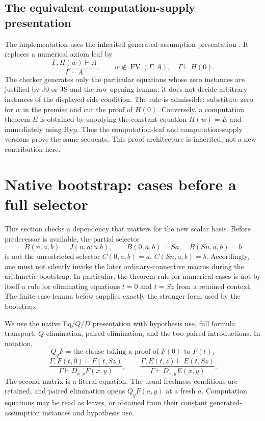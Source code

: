 \documentclass[11pt,letterpaper]{article}
\theoremstyle{definition}\newtheorem{definition}[theorem]{Definition}
\theoremstyle{remark}\newtheorem{remark}[theorem]{Remark}
\newcommand{\FV}{\operatorname{FV}}
\begin{document}
\subsection{The equivalent computation-supply presentation}
The implementation uses the inherited generated-assumption presentation
\cite{generated}. It replaces a numerical axiom leaf by
\[
 \frac{\Gamma,H(w)\vdash A}{\Gamma\vdash A},\qquad
 w\notin\FV(\Gamma,A),\quad \Gamma\vdash H(0).
 \tag{Known-instance supply}
\]
The checker generates only the particular equations whose zero instances
are justified by J0 or JS and the raw opening lemma; it does not decide
arbitrary instances of the displayed side condition. The rule is
admissible: substitute zero for $w$ in the premise and cut the proof of
$H(0)$. Conversely, a computation theorem $E$ is obtained by supplying
the constant equation $H(w)=E$ and immediately using Hyp. Thus the
computation-leaf and computation-supply versions prove the same sequents.
This proof architecture is inherited, not a new contribution here.


\section{Native bootstrap: cases before a full selector}
\label{nb:section}

This section checks a dependency that matters for the new scalar basis.
Before predecessor is available, the partial selector
\[
 B(n,a,b)=J(n,a;u.b),\qquad B(0,a,b)=Sa,\quad B(Sn,a,b)=b
\]
is not the unrestricted selector $C(0,a,b)=a$, $C(Sn,a,b)=b$.
Accordingly, one must not silently invoke the later ordinary-connective
macros during the arithmetic bootstrap.  In particular, the theorem rule
for numerical cases is not by itself a rule for eliminating equations
$t=0$ and $t=Sz$ from a retained context.  The finite-case lemma below
supplies exactly the stronger form used by the bootstrap.

We use the native Eq/$Q$/$D$ presentation with hypothesis use, full
formula transport, $Q$ elimination, paired elimination, and the two
paired introductions.  In notation,
\[
 Q_yF=\text{the clause taking a proof of }F(0)\text{ to }F(t),
\]
\[
 \frac{\Gamma,F(t,0)\vdash F(t,Sz)}
      {\Gamma\vdash D_{x,y}F(x,y)},\qquad
 \frac{\Gamma,E(t,z)\vdash E(t,Sz)}
      {\Gamma\vdash D_{x,y}E(x,y)}.
\]
The second matrix is a literal equation.  The usual freshness conditions
are retained, and paired elimination opens $Q_yF(a,y)$ at a fresh $a$.
Computation equations may be read as leaves, or obtained from their
constant generated-assumption instances and hypothesis use.
\end{document}
